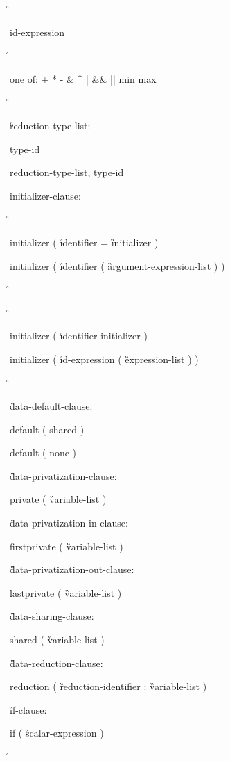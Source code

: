 {\G\cspecificend

\cppspecificstart

\I id-expression 

\G\cppspecificend

\ccppspecificstart

\I one of: \C + * - \& \^ { } \C | \&\& || min max 

\G\ccppspecificend

\G reduction-type-list: 

\I type-id 

\I reduction-type-list, type-id 

\begin{samepage}
initializer-clause: 

\G\cspecificstart

\C\I initializer ( \G identifier \C = \G initializer \C )

\C\I initializer ( \G identifier \C ( \G argument-expression-list \C ) ) 

\G\cspecificend
\end{samepage}

\G\cppspecificstart

\C\I initializer \C ( \G identifier initializer \C )

\I initializer \C ( \G id-expression \C ( \G expression-list \C ) ) 

\G\cppspecificend

\G data-default-clause:

\C\I default ( shared )

\I default ( none )

\G data-privatization-clause:

\C\I private ( \G variable-list \C )

\G data-privatization-in-clause:

\C\I firstprivate ( \G variable-list \C )

\G data-privatization-out-clause:

\C\I lastprivate ( \G variable-list \C )

\G data-sharing-clause:

\C\I shared ( \G variable-list \C )

\G data-reduction-clause:

\C\I reduction ( \G reduction-identifier \C : \G variable-list \C )

\G if-clause:

\C\I if ( \G scalar-expression \C )

\G\cspecificstart

}
